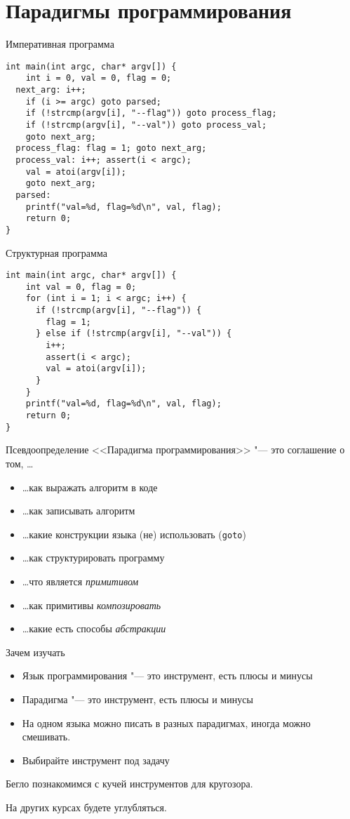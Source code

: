 \section{Парадигмы программирования}
\begin{frame}[t,fragile]{Императивная программа}
\begin{verbatim}
int main(int argc, char* argv[]) {
    int i = 0, val = 0, flag = 0;
  next_arg: i++;
    if (i >= argc) goto parsed;
    if (!strcmp(argv[i], "--flag")) goto process_flag;
    if (!strcmp(argv[i], "--val")) goto process_val;
    goto next_arg;
  process_flag: flag = 1; goto next_arg;
  process_val: i++; assert(i < argc);
    val = atoi(argv[i]);
    goto next_arg;
  parsed:
    printf("val=%d, flag=%d\n", val, flag);
    return 0;
}
\end{verbatim}
\end{frame}

\begin{frame}[t,fragile]{Структурная программа}
\begin{verbatim}
int main(int argc, char* argv[]) {
    int val = 0, flag = 0;
    for (int i = 1; i < argc; i++) {
      if (!strcmp(argv[i], "--flag")) {
        flag = 1;
      } else if (!strcmp(argv[i], "--val")) {
        i++;
        assert(i < argc);
        val = atoi(argv[i]);
      }
    }
    printf("val=%d, flag=%d\n", val, flag);
    return 0;
}
\end{verbatim}
\end{frame}

\begin{frame}[t,fragile]{Псевдоопределение}
	<<Парадигма программирования>> "--- это соглашение о том, \ldots
	\begin{itemize}
	\item \ldots как выражать алгоритм в коде
	\item \ldots как записывать алгоритм
	\item \ldots какие конструкции языка (не) использовать (\verb!goto!)
	\item \ldots как структурировать программу
	\item \ldots что является \textit{примитивом}
	\item \ldots как примитивы \textit{композировать}
	\item \ldots какие есть способы \textit{абстракции}
	\end{itemize}
\end{frame}

\begin{frame}[t,fragile]{Зачем изучать}
	\begin{itemize}
	\item Язык программирования "--- это инструмент, есть плюсы и минусы
	\item Парадигма "--- это инструмент, есть плюсы и минусы
	\item	На одном языка можно писать в разных парадигмах, иногда можно смешивать.
	\item Выбирайте инструмент под задачу
	\end{itemize}
	Бегло познакомимся с кучей инструментов для кругозора.

	На других курсах будете углубляться.
\end{frame}
